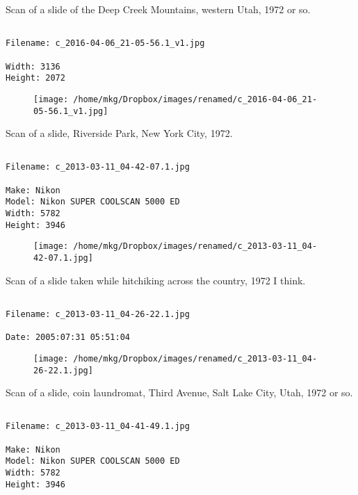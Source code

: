 \clearpage
\onecolumn
\noindent Scan of a slide of the Deep Creek Mountains, western Utah, 1972 or so.
\noindent
\begin{lstlisting}

Filename: c_2016-04-06_21-05-56.1_v1.jpg

Width: 3136
Height: 2072
\end{lstlisting}
\clearpage

\begin{figure}
\texttt{[image: /home/mkg/Dropbox/images/renamed/c\_2016-04-06\_21-05-56.1\_v1.jpg]}
\end{figure}
    
\clearpage
\onecolumn
\noindent Scan of a slide, Riverside Park, New York City, 1972.
\noindent
\begin{lstlisting}

Filename: c_2013-03-11_04-42-07.1.jpg

Make: Nikon
Model: Nikon SUPER COOLSCAN 5000 ED
Width: 5782
Height: 3946
\end{lstlisting}
\clearpage

\begin{figure}
\texttt{[image: /home/mkg/Dropbox/images/renamed/c\_2013-03-11\_04-42-07.1.jpg]}
\end{figure}
    
\clearpage
\onecolumn
\noindent Scan of a slide taken while hitchiking across the country, 1972 I think.
\noindent
\begin{lstlisting}

Filename: c_2013-03-11_04-26-22.1.jpg

Date: 2005:07:31 05:51:04
\end{lstlisting}
\clearpage

\begin{figure}
\texttt{[image: /home/mkg/Dropbox/images/renamed/c\_2013-03-11\_04-26-22.1.jpg]}
\end{figure}
    
\clearpage
\onecolumn
\noindent Scan of a slide, coin laundromat, Third Avenue, Salt Lake City, Utah, 1972 or so.
\noindent
\begin{lstlisting}

Filename: c_2013-03-11_04-41-49.1.jpg

Make: Nikon
Model: Nikon SUPER COOLSCAN 5000 ED
Width: 5782
Height: 3946
\end{lstlisting}
\clearpage

